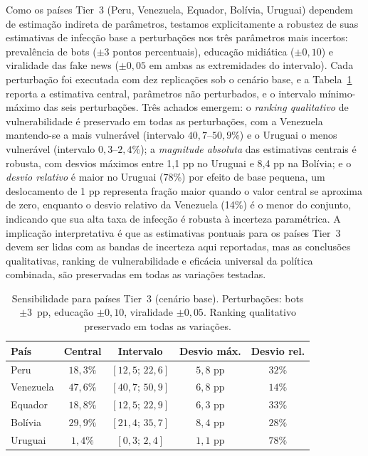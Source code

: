 \documentclass[12pt,a4paper]{article}
\theoremstyle{definition}
\theoremstyle{plain}
\begin{document}
Como os países Tier~3 (Peru, Venezuela, Equador, Bolívia, Uruguai) dependem de estimação indireta de parâmetros, testamos explicitamente a robustez de suas estimativas de infecção base a perturbações nos três parâmetros mais incertos: prevalência de bots ($\pm 3$ pontos percentuais), educação midiática ($\pm 0{,}10$) e viralidade das fake news ($\pm 0{,}05$ em ambas as extremidades do intervalo). Cada perturbação foi executada com dez replicações sob o cenário base, e a Tabela~\ref{tab:sensitivity_tier3} reporta a estimativa central, parâmetros não perturbados, e o intervalo mínimo-máximo das seis perturbações. Três achados emergem: o \emph{ranking qualitativo} de vulnerabilidade é preservado em todas as perturbações, com a Venezuela mantendo-se a mais vulnerável (intervalo $40{,}7$--$50{,}9\%$) e o Uruguai o menos vulnerável (intervalo $0{,}3$--$2{,}4\%$); a \emph{magnitude absoluta} das estimativas centrais é robusta, com desvios máximos entre 1,1 pp no Uruguai e 8,4 pp na Bolívia; e o \emph{desvio relativo} é maior no Uruguai (78\%) por efeito de base pequena, um deslocamento de 1 pp representa fração maior quando o valor central se aproxima de zero, enquanto o desvio relativo da Venezuela (14\%) é o menor do conjunto, indicando que sua alta taxa de infecção é robusta à incerteza paramétrica. A implicação interpretativa é que as estimativas pontuais para os países Tier~3 devem ser lidas com as bandas de incerteza aqui reportadas, mas as conclusões qualitativas, ranking de vulnerabilidade e eficácia universal da política combinada, são preservadas em todas as variações testadas.

\begin{table}[H]
\centering
\small
\setlength{\tabcolsep}{8pt}
\begin{tabular}{lcccc}
\toprule
\textbf{País} & \textbf{Central} & \textbf{Intervalo} & \textbf{Desvio máx.} & \textbf{Desvio rel.} \\
\midrule
Peru      & $18{,}3\%$ & $[12{,}5;\,22{,}6]$ & $5{,}8$ pp & $32\%$ \\
Venezuela & $47{,}6\%$ & $[40{,}7;\,50{,}9]$ & $6{,}8$ pp & $14\%$ \\
Equador   & $18{,}8\%$ & $[12{,}5;\,22{,}9]$ & $6{,}3$ pp & $33\%$ \\
Bolívia   & $29{,}9\%$ & $[21{,}4;\,35{,}7]$ & $8{,}4$ pp & $28\%$ \\
Uruguai   & $1{,}4\%$  & $[0{,}3;\,2{,}4]$   & $1{,}1$ pp & $78\%$ \\
\bottomrule
\end{tabular}
\caption{Sensibilidade para países Tier~3 (cenário base). Perturbações: bots $\pm 3$~pp, educação $\pm 0{,}10$, viralidade $\pm 0{,}05$. Ranking qualitativo preservado em todas as variações.}
\label{tab:sensitivity_tier3}
\end{table}
\end{document}
